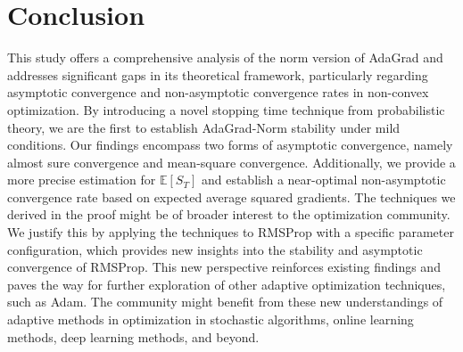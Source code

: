 \documentclass[standalone]{article}
\newcommand{\E}{\mathbb{E}}
\begin{document}
\section{Conclusion}\label{sec:conclusion}

This study offers a comprehensive analysis of the norm version of AdaGrad and addresses significant gaps in its theoretical framework, particularly regarding asymptotic convergence and non-asymptotic convergence rates in non-convex optimization. By introducing a novel stopping time technique from probabilistic theory, we are the first to establish AdaGrad-Norm stability under mild conditions. Our findings encompass two forms of asymptotic convergence, namely almost sure convergence and mean-square convergence. Additionally, we provide a more precise estimation for $\E[S_T]$ and establish a near-optimal non-asymptotic convergence rate based on expected average squared gradients. The techniques we derived in the proof might be of broader interest to the optimization community. We justify this by applying the techniques to RMSProp with a specific parameter configuration, which provides new insights into the stability and asymptotic convergence of RMSProp. This new perspective reinforces existing findings and paves the way for further exploration of other adaptive optimization techniques, such as Adam. The community might benefit from these new understandings of adaptive methods in optimization in stochastic algorithms, online learning methods, deep learning methods, and beyond.



% 



\appendix
\end{document}
